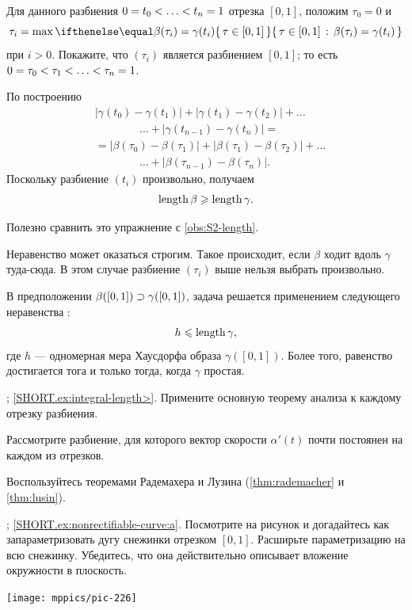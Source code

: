 \begin{multicols}{2}
Для данного разбиения $0=t_0<\z\dots <t_n\z=1$ отрезка $[0,1]$, положим $\tau_0=0$ и 
\[\tau_i=\max\set{\tau \in[0,1]}{\beta(\tau_i)=\gamma(t_i)}\]
при $i>0$.
Покажите, что $(\tau_i)$ является разбиением $[0,1]$;
то есть $0=\tau_0<\tau_1<\z\dots<\tau_n=1$.

По построению 
\begin{align*}
&|\gamma(t_0)-\gamma(t_1)|+|\gamma(t_1)-\gamma(t_2)|+\dots
\\
&\qquad\qquad\dots+|\gamma(t_{n-1})-\gamma(t_n)|=
\\
&=
|\beta(\tau_0)-\beta(\tau_1)|+|\beta(\tau_1)-\beta(\tau_2)|+\dots
\\
&\qquad\qquad\dots+|\beta(\tau_{n-1})-\beta(\tau_n)|.
\end{align*}
Поскольку разбиение $(t_i)$ произвольно, получаем 
\[\mathop{\rm length}\nolimits \beta\geqslant \mathop{\rm length}\nolimits \gamma.\]

Полезно сравнить это упражнение с \ref{obs:S2-length}.

Неравенство может оказаться строгим.
Такое происходит, если $\beta$ ходит вдоль $\gamma$ туда-сюда.
В этом случае разбиение $(\tau_i)$ выше нельзя выбрать произвольно.

В предположении $\beta([0,1])\z\supset\gamma([0,1])$, задача решается применением следующего неравенства \cite[2.6.1+2.6.2]{burago-burago-ivanov}:
\[h\leqslant \mathop{\rm length}\nolimits\gamma,\] где $h$ --- одномерная мера Хаусдорфа образа $\gamma([0,1])$.
Более того, равенство достигается тога и только тогда, когда $\gamma$ простая.

\parbf{\ref{ex:integral-length}}; \ref{SHORT.ex:integral-length>}.
Примените основную теорему анализа к каждому отрезку разбиения.

Рассмотрите разбиение, для которого вектор скорости $\alpha'(t)$ почти постоянен на каждом из отрезков.

Воспользуйтесь теоремами Радемахера и Лузина (\ref{thm:rademacher} и \ref{thm:lusin}).

\parbf{\ref{ex:nonrectifiable-curve}}; \ref{SHORT.ex:nonrectifiable-curve:a}.
Посмотрите на рисунок и догадайтесь как запараметризовать дугу снежинки отрезком $[0,1]$.
Расширьте параметризацию на всю снежинку.
Убедитесь, что она действительно описывает вложение окружности в плоскость.

\begin{Figure}
\vskip-0mm
\centering
\texttt{[image: mppics/pic-226]}
\vskip0mm
\end{Figure}


\end{multicols}
